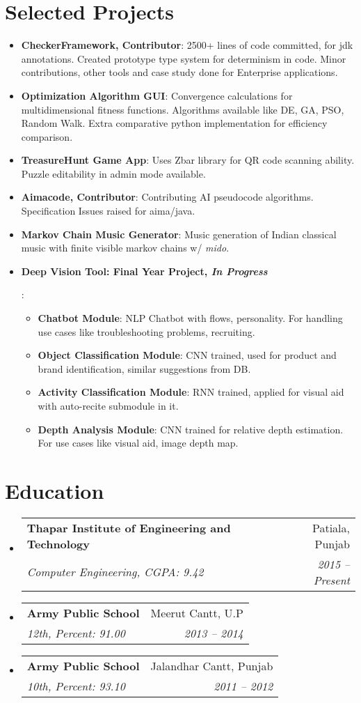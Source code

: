 \documentclass[letterpaper,10pt]{article}
\makeatletter
\newcommand{\resumeItem}[2]{
  \item\small{
    \textbf{#1}{: #2 \vspace{-2pt}}
  }
}
\newcommand{\resumeSubheading}[4]{
  \vspace{-1pt}\item
    \begin{tabular*}{0.97\textwidth}{l@{\extracolsep{\fill}}r}
      \textbf{#1} & #2 \\
      \textit{\small#3} & \textit{\small #4} \\
    \end{tabular*}\vspace{-5pt}
}
\newcommand{\resumeSubItem}[2]{\resumeItem{#1}{#2}\vspace{-4pt}}
\newcommand{\resumeSubHeadingListStart}{\begin{itemize}[leftmargin=*]}
\newcommand{\resumeSubHeadingListEnd}{\end{itemize}}
\newcommand{\resumeItemListStart}{\begin{itemize}}
\newcommand{\resumeItemListEnd}{\end{itemize}\vspace{-5pt}}
\makeatother
\begin{document}
\section{Selected Projects}
  \resumeSubHeadingListStart
    \resumeSubItem{CheckerFramework, Contributor}
      {2500+ lines of code committed, for jdk annotations. Created prototype type system for determinism in code. Minor contributions, other tools and case study done for Enterprise applications.}
    \resumeSubItem{Optimization Algorithm GUI}
      {Convergence calculations for multidimensional fitness functions. Algorithms available like DE, GA, PSO, Random Walk. Extra comparative	python implementation for efficiency comparison.}
    \resumeSubItem{TreasureHunt Game App}
      {Uses Zbar library for QR code scanning ability. Puzzle editability in admin mode available.}
    \resumeSubItem{Aimacode, Contributor}
      {Contributing AI pseudocode algorithms. Specification Issues raised for aima/java.}
    \resumeSubItem{Markov Chain Music Generator}
      {Music generation of Indian classical music with finite visible markov chains w/ \textit{mido}.}
    \resumeSubItem{Deep Vision Tool: Final Year Project, \textit{In Progress}}
      {
	    \resumeItemListStart
        \resumeItem{Chatbot Module}
          {NLP Chatbot with flows, personality. For handling use cases like troubleshooting problems, recruiting.}
        \resumeItem{Object Classification Module}
          {CNN trained, used for product and brand identification, similar suggestions from DB.}
        \resumeItem{Activity Classification Module}
          {RNN trained, applied for visual aid with auto-recite submodule in it.}
        \resumeItem{Depth Analysis Module}
          {CNN trained for relative depth estimation. For use cases like visual aid, image depth map.}
       \resumeItemListEnd
      }
  \resumeSubHeadingListEnd

\section{Education}
  \resumeSubHeadingListStart
    \resumeSubheading
      {Thapar Institute of Engineering and Technology}{Patiala, Punjab}
      {Computer Engineering, CGPA: 9.42}{2015 -- Present}
    \resumeSubheading
      {Army Public School}{Meerut Cantt, U.P}
      {12th,  Percent: 91.00}{2013 -- 2014}
    \resumeSubheading
      {Army Public School}{Jalandhar Cantt, Punjab}
      {10th,  Percent: 93.10}{2011 -- 2012}      
  \resumeSubHeadingListEnd
\end{document}
